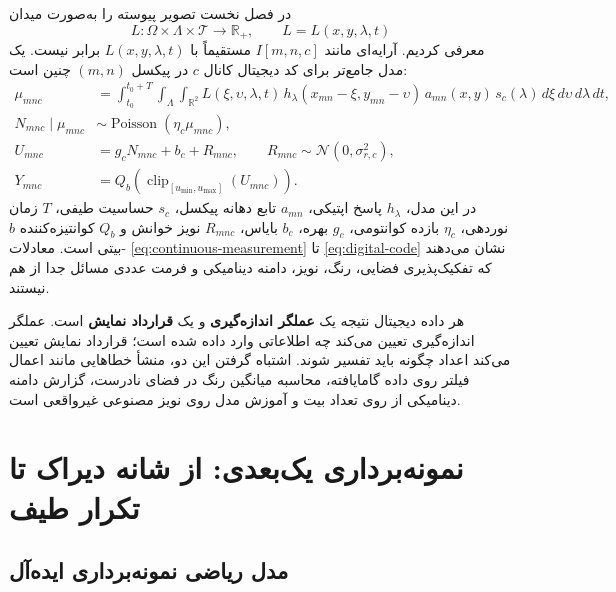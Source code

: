 \documentclass[12pt,openany,oneside]{book}
\newcommand{\R}{\mathbb{R}}
\newcommand{\clip}{\operatorname{clip}}
\begin{document}
در فصل نخست تصویر پیوسته را به‌صورت میدان
\begin{equation}
L:\Omega\times\Lambda\times\mathcal T\longrightarrow\R_{+},
\qquad L=L(x,y,\lambda,t)
\end{equation}
معرفی کردیم. آرایه‌ای مانند \(I[m,n,c]\) مستقیماً با \(L(x,y,\lambda,t)\) برابر نیست.
یک مدل جامع‌تر برای کد دیجیتال کانال \(c\) در پیکسل \((m,n)\) چنین است:
\begin{align}
\mu_{mnc}
&=\int_{t_0}^{t_0+T}\int_{\Lambda}\int_{\R^2}
L(\xi,\upsilon,\lambda,t)\,
 h_{\lambda}(x_{mn}-\xi,y_{mn}-\upsilon)\,
 a_{mn}(x,y)\,s_c(\lambda)
\,d\xi\,d\upsilon\,d\lambda\,dt,\label{eq:continuous-measurement}\\
N_{mnc}\mid\mu_{mnc}&\sim\operatorname{Poisson}(\eta_c\mu_{mnc}),\label{eq:poisson-electrons}\\
U_{mnc}&=g_cN_{mnc}+b_c+R_{mnc},\qquad R_{mnc}\sim\mathcal N(0,\sigma_{r,c}^{2}),\label{eq:analog-sensor}\\
Y_{mnc}&=Q_b\!\left(\clip_{[u_{\min},u_{\max}]}(U_{mnc})\right).
\label{eq:digital-code}
\end{align}
در این مدل، \(h_\lambda\) پاسخ اپتیکی، \(a_{mn}\) تابع دهانه پیکسل، \(s_c\) حساسیت طیفی،
\(T\) زمان نوردهی، \(\eta_c\) بازده کوانتومی، \(g_c\) بهره، \(b_c\) بایاس،
\(R_{mnc}\) نویز خوانش و \(Q_b\) کوانتیزه‌کننده \(b\)-بیتی است.
معادلات \eqref{eq:continuous-measurement} تا \eqref{eq:digital-code} نشان می‌دهند که
تفکیک‌پذیری فضایی، رنگ، نویز، دامنه دینامیکی و فرمت عددی مسائل جدا از هم نیستند.

\begin{keybox}
هر داده دیجیتال نتیجه یک \textbf{عملگر اندازه‌گیری} و یک \textbf{قرارداد نمایش} است.
عملگر اندازه‌گیری تعیین می‌کند چه اطلاعاتی وارد داده شده است؛ قرارداد نمایش تعیین می‌کند
اعداد چگونه باید تفسیر شوند. اشتباه گرفتن این دو، منشأ خطاهایی مانند اعمال فیلتر روی داده
گامایافته، محاسبه میانگین رنگ در فضای نادرست، گزارش دامنه دینامیکی از روی تعداد بیت و
آموزش مدل روی نویز مصنوعی غیرواقعی است.
\end{keybox}

\section{نمونه‌برداری یک‌بعدی: از شانه دیراک تا تکرار طیف}

\subsection{مدل ریاضی نمونه‌برداری ایده‌آل}
\end{document}
